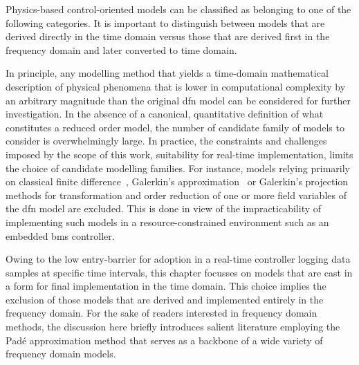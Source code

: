 Physics-based control-oriented models  can be classified as belonging  to one of
the following categories. It
is important to distinguish between models that are derived directly in the time
domain versus  those that are  derived first in  the frequency domain  and later
converted to time domain.


In  principle,  any modelling  method  that  yields a  time-domain  mathematical
description of physical  phenomena that is lower in  computational complexity by
an arbitrary magnitude  than the original \gls{dfn} model can  be considered for
further investigation. In the absence of a canonical, quantitative definition of
what  constitutes a  reduced  order model,  the number  of  candidate family  of
models  to  consider  is  overwhelmingly large.  In  practice,  the  constraints  and  challenges  imposed  by
the  scope  of  this  work, \viz{}  suitability  for  real-time  implementation,
limits  the  choice  of  candidate  modelling  families.  For  instance,  models
relying  primarily on  classical finite  difference~\cite{Smith2006}, Galerkin's
approximation~\cite{Dao2012} or Galerkin's projection~\cite{Fan2018} methods for
transformation  and order  reduction  of  one or  more  field  variables of  the
\gls{dfn} model  are excluded. This is  done in view of  the impracticability of
implementing  such  models in  a  resource-constrained  environment such  as  an
embedded \gls{bms} controller.


Owing to  the low entry-barrier for  adoption in a real-time  controller logging
data samples  at specific time intervals,  this chapter focusses on  models that
are cast  in a  form for final  implementation in the  time domain.  This choice
implies the exclusion of those models  that are derived and implemented entirely
in the frequency domain. For the  sake of readers interested in frequency domain
methods, the discussion here briefly introduces salient literature employing the
Padé  approximation method  that serves  as  a backbone  of a  wide variety  of
frequency domain models.


